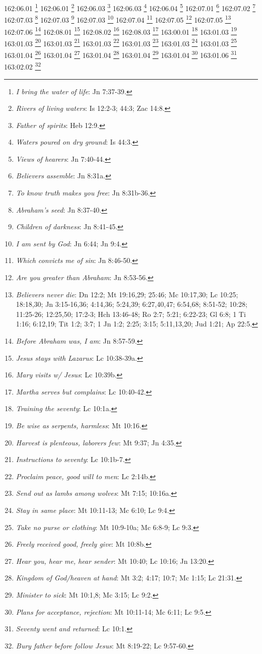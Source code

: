 162:06.01 \footnote{\textit{I bring the water of life}: Jn 7:37-39.}
162:06.01 \footnote{\textit{Rivers of living waters}: Is 12:2-3; 44:3; Zac 14:8.}
162:06.03 \footnote{\textit{Father of spirits}: Heb 12:9.}
162:06.03 \footnote{\textit{Waters poured on dry ground}: Is 44:3.}
162:06.04 \footnote{\textit{Views of hearers}: Jn 7:40-44.}
162:07.01 \footnote{\textit{Believers assemble}: Jn 8:31a.}
162:07.02 \footnote{\textit{To know truth makes you free}: Jn 8:31b-36.}
162:07.03 \footnote{\textit{Abraham's seed}: Jn 8:37-40.}
162:07.03 \footnote{\textit{Children of darkness}: Jn 8:41-45.}
162:07.03 \footnote{\textit{I am sent by God}: Jn 6:44; Jn 9:4.}
162:07.04 \footnote{\textit{Which convicts me of sin}: Jn 8:46-50.}
162:07.05 \footnote{\textit{Are you greater than Abraham}: Jn 8:53-56.}
162:07.05 \footnote{\textit{Believers never die}: Dn 12:2; Mt 19:16,29; 25:46; Mc 10:17,30; Lc 10:25; 18:18,30; Jn 3:15-16,36; 4:14,36; 5:24,39; 6:27,40,47; 6:54,68; 8:51-52; 10:28; 11:25-26; 12:25,50; 17:2-3; Hch 13:46-48; Ro 2:7; 5:21; 6:22-23; Gl 6:8; 1 Ti 1:16; 6:12,19; Tit 1:2; 3:7; 1 Jn 1:2; 2:25; 3:15; 5:11,13,20; Jud 1:21; Ap 22:5.}
162:07.06 \footnote{\textit{Before Abraham was, I am}: Jn 8:57-59.}
162:08.01 \footnote{\textit{Jesus stays with Lazarus}: Lc 10:38-39a.}
162:08.02 \footnote{\textit{Mary visits w/ Jesus}: Lc 10:39b.}
162:08.03 \footnote{\textit{Martha serves but complains}: Lc 10:40-42.}
163:00.01 \footnote{\textit{Training the seventy}: Lc 10:1a.}
163:01.03 \footnote{\textit{Be wise as serpents, harmless}: Mt 10:16.}
163:01.03 \footnote{\textit{Harvest is plenteous, laborers few}: Mt 9:37; Jn 4:35.}
163:01.03 \footnote{\textit{Instructions to seventy}: Lc 10:1b-7.}
163:01.03 \footnote{\textit{Proclaim peace, good will to men}: Lc 2:14b.}
163:01.03 \footnote{\textit{Send out as lambs among wolves}: Mt 7:15; 10:16a.}
163:01.03 \footnote{\textit{Stay in same place}: Mt 10:11-13; Mc 6:10; Lc 9:4.}
163:01.03 \footnote{\textit{Take no purse or clothing}: Mt 10:9-10a; Mc 6:8-9; Lc 9:3.}
163:01.04 \footnote{\textit{Freely received good, freely give}: Mt 10:8b.}
163:01.04 \footnote{\textit{Hear you, hear me, hear sender}: Mt 10:40; Lc 10:16; Jn 13:20.}
163:01.04 \footnote{\textit{Kingdom of God/heaven at hand}: Mt 3:2; 4:17; 10:7; Mc 1:15; Lc 21:31.}
163:01.04 \footnote{\textit{Minister to sick}: Mt 10:1,8; Mc 3:15; Lc 9:2.}
163:01.04 \footnote{\textit{Plans for acceptance, rejection}: Mt 10:11-14; Mc 6:11; Lc 9:5.}
163:01.06 \footnote{\textit{Seventy went and returned}: Lc 10:1.}
163:02.02 \footnote{\textit{Bury father before follow Jesus}: Mt 8:19-22; Lc 9:57-60.}
